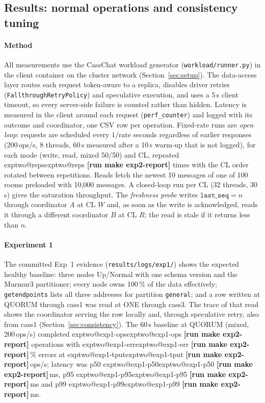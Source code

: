 \providecommand{\exptwo}[1]{%
  \ifcsname exptwo@#1\endcsname\csname exptwo@#1\endcsname
  \else\textbf{[run make exp2-report]}\fi}

\subsection{Results: normal operations and consistency tuning}\label{sec:results-exp2}

\paragraph{Method}
All measurements use the CassChat workload generator (\texttt{workload/runner.py}) in the
client container on the cluster network (Section~\ref{sec:setup}). The data-access layer
routes each request token-aware to a replica, disables driver retries
(\texttt{FallthroughRetryPolicy}) and speculative execution, and uses a 5\,s client timeout,
so every server-side failure is counted rather than hidden. Latency is measured in the
client around each request (\texttt{perf\_counter}) and logged with its outcome and
coordinator, one CSV row per operation. Fixed-rate runs are \emph{open loop}: requests are
scheduled every $1/\text{rate}$ seconds regardless of earlier responses
(200\,ops/s, 8 threads, 60\,s measured after a 10\,s warm-up that is not logged), for
each mode (write, read, mixed 50/50) and CL, repeated \exptwo{reps} times with the CL order
rotated between repetitions. Reads fetch the newest 10 messages of one of 100 rooms
preloaded with 10{,}000 messages. A closed-loop run per CL (32 threads, 30\,s) gives the
saturation throughput. The \emph{freshness probe} writes $\texttt{last\_seq} = n$ through
coordinator $A$ at CL $W$ and, as soon as the write is acknowledged, reads it through a
different coordinator $B$ at CL $R$; the read is stale if it returns less than $n$.

\paragraph{Experiment 1}
The committed Exp~1 evidence (\texttt{results/logs/exp1/}) shows the expected healthy
baseline: three nodes Up/Normal with one schema version and the Murmur3 partitioner; every
node owns 100\,\% of the data effectively; \texttt{getendpoints} lists all three
addresses for partition \texttt{general}; and a row written at QUORUM through cass1 was read
at ONE through cass3. The trace of that read shows the coordinator serving the row
locally and, through speculative retry, also from cass1 (Section~\ref{sec:consistency}).
The 60\,s baseline at QUORUM (mixed, 200\,ops/s) completed \exptwo{exp1-ops} operations
with \exptwo{exp1-err}\,\% errors at \exptwo{exp1-tput}\,ops/s; latency was
p50 \exptwo{exp1-p50}\,ms, p95 \exptwo{exp1-p95}\,ms and p99 \exptwo{exp1-p99}\,ms.

